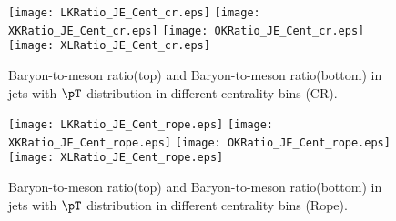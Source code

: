 \begin{figure}[ht]
        \begin{center}
                \texttt{[image: LKRatio\_JE\_Cent\_cr.eps]}
                \texttt{[image: XKRatio\_JE\_Cent\_cr.eps]}
                \texttt{[image: OKRatio\_JE\_Cent\_cr.eps]}
                \texttt{[image: XLRatio\_JE\_Cent\_cr.eps]}
        \end{center}
	\caption{Baryon-to-meson ratio(top) and Baryon-to-meson ratio(bottom) in jets with $\pT$ distribution in different centrality bins (CR).}
        \label{fig:JEParRatioCentcr}
\end{figure}
\begin{figure}[ht]
        \begin{center}
                \texttt{[image: LKRatio\_JE\_Cent\_rope.eps]}
                \texttt{[image: XKRatio\_JE\_Cent\_rope.eps]}
                \texttt{[image: OKRatio\_JE\_Cent\_rope.eps]}
                \texttt{[image: XLRatio\_JE\_Cent\_rope.eps]}
        \end{center}
	\caption{Baryon-to-meson ratio(top) and Baryon-to-meson ratio(bottom) in jets with $\pT$ distribution in different centrality bins (Rope).}
        \label{fig:JEParRatioCentrope}
\end{figure}
